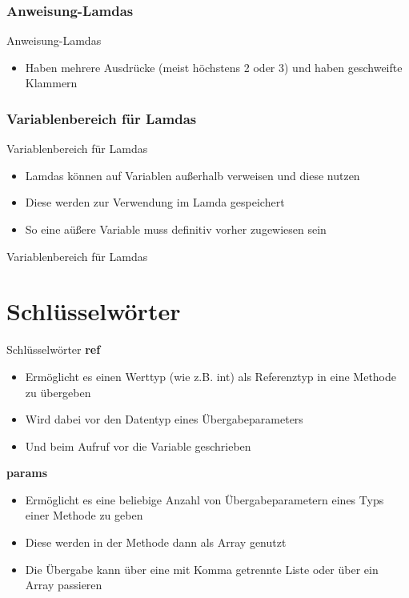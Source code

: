 \subsubsection{Anweisung-Lamdas}
\begin{frame}{Anweisung-Lamdas}
	\begin{itemize}
		\item Haben mehrere Ausdrücke (meist höchstens 2 oder 3) und haben geschweifte Klammern		
	\end{itemize}
	
	
\end{frame}

\subsubsection{Variablenbereich für Lamdas}
\begin{frame}{Variablenbereich für Lamdas}
	\begin{itemize}
		\item Lamdas können auf Variablen außerhalb verweisen und diese nutzen
		\item Diese werden zur Verwendung im Lamda gespeichert
		\item So eine aüßere Variable muss definitiv vorher zugewiesen sein
	\end{itemize}
	
\end{frame}

\begin{frame}{Variablenbereich für Lamdas}
	
\end{frame}

\section{Schlüsselwörter}
\begin{frame}{Schlüsselwörter}
	\textbf{ref}\\
	\begin{itemize}
		\item Ermöglicht es einen Werttyp (wie z.B. int) als Referenztyp in eine Methode zu übergeben
		\item Wird dabei vor den Datentyp eines Übergabeparameters
		\item Und beim Aufruf vor die Variable geschrieben
	\end{itemize}
	\textbf{params}\\
	\begin{itemize}
		\item Ermöglicht es eine beliebige Anzahl von Übergabeparametern eines Typs einer Methode zu geben
		\item Diese werden in der Methode dann als Array genutzt
		\item Die Übergabe kann über eine mit Komma getrennte Liste oder über ein Array passieren
	\end{itemize}
\end{frame}


